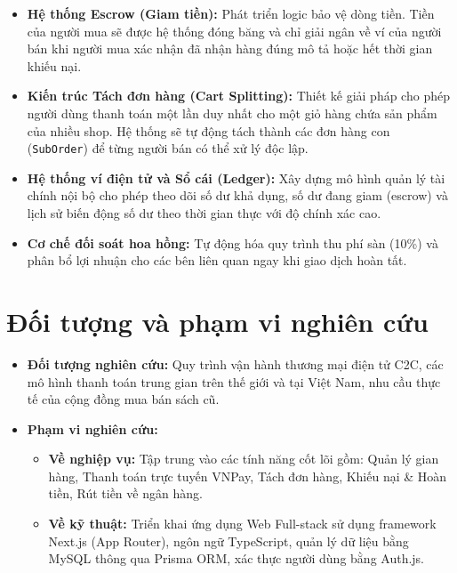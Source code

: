 \documentclass[../main.tex]{subfiles}
\begin{document}
\begin{itemize}
    \item \textbf{Hệ thống Escrow (Giam tiền):} Phát triển logic bảo vệ dòng tiền. Tiền của người mua sẽ được hệ thống đóng băng và chỉ giải ngân về ví của người bán khi người mua xác nhận đã nhận hàng đúng mô tả hoặc hết thời gian khiếu nại.
    \item \textbf{Kiến trúc Tách đơn hàng (Cart Splitting):} Thiết kế giải pháp cho phép người dùng thanh toán một lần duy nhất cho một giỏ hàng chứa sản phẩm của nhiều shop. Hệ thống sẽ tự động tách thành các đơn hàng con (\texttt{SubOrder}) để từng người bán có thể xử lý độc lập.
    \item \textbf{Hệ thống ví điện tử và Sổ cái (Ledger):} Xây dựng mô hình quản lý tài chính nội bộ cho phép theo dõi số dư khả dụng, số dư đang giam (escrow) và lịch sử biến động số dư theo thời gian thực với độ chính xác cao.
    \item \textbf{Cơ chế đối soát hoa hồng:} Tự động hóa quy trình thu phí sàn (10\%) và phân bổ lợi nhuận cho các bên liên quan ngay khi giao dịch hoàn tất.
\end{itemize}

\section{Đối tượng và phạm vi nghiên cứu}
\begin{itemize}
    \item \textbf{Đối tượng nghiên cứu:} Quy trình vận hành thương mại điện tử C2C, các mô hình thanh toán trung gian trên thế giới và tại Việt Nam, nhu cầu thực tế của cộng đồng mua bán sách cũ.
    \item \textbf{Phạm vi nghiên cứu:}
    \begin{itemize}
        \item \textbf{Về nghiệp vụ:} Tập trung vào các tính năng cốt lõi gồm: Quản lý gian hàng, Thanh toán trực tuyến VNPay, Tách đơn hàng, Khiếu nại \& Hoàn tiền, Rút tiền về ngân hàng.
        \item \textbf{Về kỹ thuật:} Triển khai ứng dụng Web Full-stack sử dụng framework Next.js (App Router), ngôn ngữ TypeScript, quản lý dữ liệu bằng MySQL thông qua Prisma ORM, xác thực người dùng bằng Auth.js.
    \end{itemize}
\end{itemize}
\end{document}

